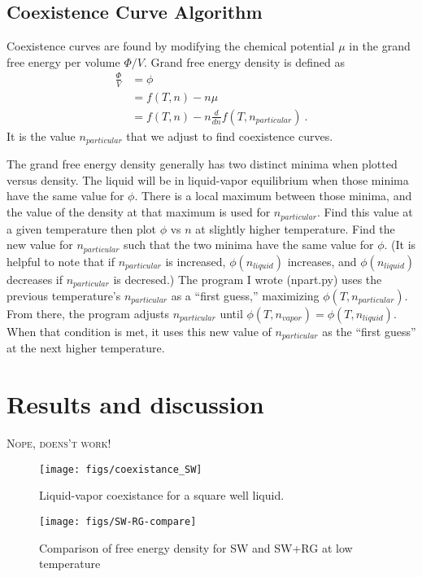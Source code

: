 \documentclass[letterpaper,twocolumn,amsmath,amssymb,prb]{revtex4-1}
\newcommand{\npart}{n_{particular}}
\newcommand{\nliq}{n_{liquid}}
\newcommand{\nvap}{n_{vapor}}
\begin{document}
\subsection{Coexistence Curve Algorithm}
Coexistence curves are found by modifying the chemical potential $\mu$
in the grand free energy per volume $\Phi/V$. Grand free energy
density is defined as
\begin{align}
  \frac{\Phi}{V} &= \phi \nonumber \\
                 &= f(T,n) - n\mu \nonumber \\
                 &= f(T,n) - n\frac{d}{dn}f(T,\npart)\ .
\end{align}
It is the value $\npart$ that we adjust to find coexistence curves.

The grand free energy density generally has two distinct minima when
plotted versus density. The liquid will be in liquid-vapor equilibrium
when those minima have the same value for $\phi$. There is a local
maximum between those minima, and the value of the density at that
maximum is used for $\npart$. Find this value at a given temperature
then plot $\phi$ vs $n$ at slightly higher temperature. Find the new
value for $\npart$ such that the two minima have the same value for
$\phi$. (It is helpful to note that if $\npart$ is increased,
$\phi(\nliq)$ increases, and $\phi(\nliq)$ decreases if $\npart$ is
decresed.) The program I wrote (npart.py) uses the previous
temperature's $\npart$ as a ``first guess,'' maximizing
$\phi(T,\npart)$. From there, the program adjusts $\npart$
until $\phi(T,\nvap) = \phi(T,\nliq)$. When that condition is met, it
uses this new value of $\npart$ as the ``first guess'' at the next
higher temperature.

\section{Results and discussion}

\textsc{Nope, doens't work!}

\begin{figure}
  \begin{center}
  \texttt{[image: figs/coexistance\_SW]}
  \end{center}
  \caption{Liquid-vapor coexistance for a square well liquid.}
  \label{fig:coexistance_SW}
\end{figure}

\begin{figure}
  \begin{center}
  \texttt{[image: figs/SW-RG-compare]}
  \end{center}
  \caption{Comparison of free energy density for SW and SW+RG at low temperature}
  \label{fig:SW-RG-compare-loT}
\end{figure}
\end{document}
